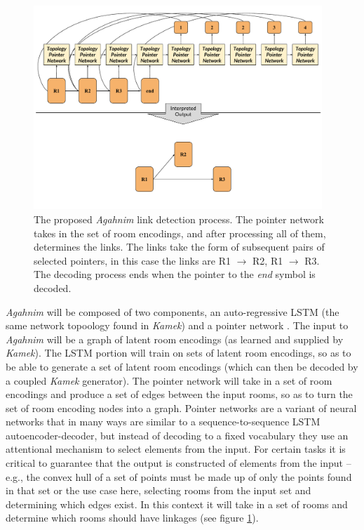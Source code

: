 \documentclass[12pt]{report}
\begin{document}
\begin{figure}[ht]
\centering
    \includegraphics[width=0.97\textwidth]{figures/Agahnim_Pointer_Process.pdf} 
   
    \caption{The proposed \textit{Agahnim} link detection process.  The pointer network takes in the set of room encodings, and after processing all of them, determines the links. The links take the form of subsequent pairs of selected pointers, in this case the links are R1 $\rightarrow$ R2, R1 $\rightarrow$ R3. The decoding process ends when the pointer to the \textit{end} symbol is decoded.}
  \label{fig:agahnim_pointer}
  \end{figure}


\textit{Agahnim} will be composed of two components, an auto-regressive LSTM (the same network topoology found in \textit{Kamek}) and a pointer network \cite{pointer_network}.  The input to \textit{Agahnim} will be a graph of latent room encodings (as learned and supplied by \textit{Kamek}).  The LSTM portion will train on sets of latent room encodings, so as to be able to generate a set of latent room encodings (which can then be decoded by a coupled \textit{Kamek} generator).  The pointer network will take in a set of room encodings and produce a set of edges between the input rooms, so as to turn the set of room encoding nodes into a graph.   Pointer networks are a variant of neural networks that in many ways are similar to a sequence-to-sequence LSTM autoencoder-decoder, but instead of decoding to a fixed vocabulary they use an attentional mechanism to select elements from the input.  For certain tasks it is critical to guarantee that the output is constructed of elements from the input -- e.g., the convex hull of a set of points must be made up of only the points found in that set or the use case here, selecting rooms from the input set and determining which edges exist. In this context it will take in a set of rooms and determine which rooms should have linkages (see figure \ref{fig:agahnim_pointer}).
  
\end{document}
